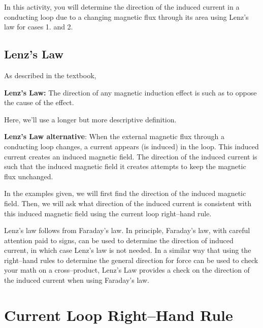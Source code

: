 \documentclass{article}
\begin{document}
In this activity, you will determine the direction of the induced current in a conducting loop due to a changing magnetic flux through its area using Lenz's law for cases 1. and 2.


\newpage

\subsection{Lenz's Law}

As described in the textbook,

{\bf Lenz's Law:} The direction of any magnetic induction effect is such as to oppose the cause of the effect.

Here, we'll use a longer but more descriptive definition.

{\bf Lenz's Law alternative}: When the external magnetic flux through a conducting loop changes, a current appears (is induced) in the loop. This induced current creates an induced magnetic field. The direction of the induced current is such that the induced magnetic field it creates attempts to keep the magnetic flux unchanged.

In the examples given, we will first find the direction of the induced magnetic field. Then, we will ask what direction of the induced current is consistent with this induced magnetic field using the current loop right--hand rule.

Lenz's law follows from Faraday's law. In principle, Faraday's law, with careful attention paid to signs, can be used to determine the direction of induced current, in which case Lenz's law is not needed. In a similar way that using the right--hand rules to determine the general direction for force can be used to check your math on a cross--product, Lenz's Law provides a check on the direction of the induced current when using Faraday's law.

\section{Current Loop Right--Hand Rule}
\end{document}

